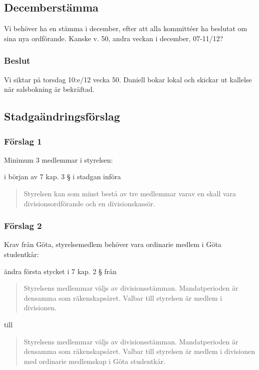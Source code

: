 \documentclass[protokoll]{dvd}
\begin{document}
\subsection{Decemberstämma}
Vi behöver ha en stämma i december, efter att alla kommittéer ha beslutat om sina nya ordförande. Kanske v. 50, andra veckan i december, 07-11/12?
\subsubsection{Beslut}
\begin{attsatser}
    \item Vi siktar på torsdag 10:e/12 vecka 50. Daniell bokar lokal och skickar ut kallelse när salsbokning är bekräftad. 
\end{attsatser}


\subsection{Stadgaändringsförslag }

\subsubsection*{Förslag 1}
Minimum 3 medlemmar i styrelsen: 
\begin{attsatser}
    \item i början av 7 kap. 3 § i stadgan införa 
    \begin{quote}
        Styrelsen kan som minst bestå av tre medlemmar varav en skall vara divisionsordförande och en divisionskassör. 
    \end{quote}
\end{attsatser}

\subsubsection*{Förslag 2}
Krav från Göta, styrelsemedlem behöver vara ordinarie medlem i Göta studentkår:
\begin{attsatser}
    \item ändra första stycket i 7 kap. 2 § från
    \begin{quote}
        Styrelsens medlemmar väljs av divisionsstämman. Mandatperioden är densamma som räkenskapsåret. Valbar till styrelsen är medlem i divisionen.
    \end{quote}
    till
    \begin{quote}
        Styrelsens medlemmar väljs av divisionsstämman. Mandatperioden är densamma som räkenskapsåret. Valbar till styrelsen är medlem i divisionen med ordinarie medlemskap i Göta studentkår.
    \end{quote}
\end{attsatser}
\end{document}
